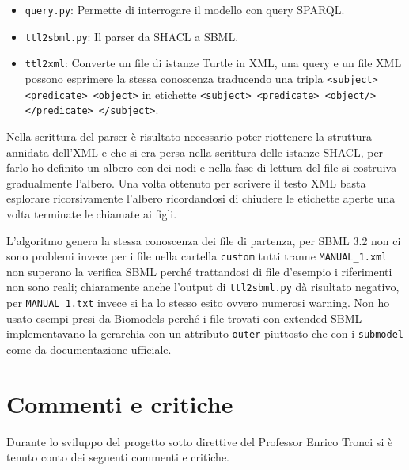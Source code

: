 \documentclass{article}
\begin{document}
\begin{itemize}
    \item \texttt{query.py}: Permette di interrogare il modello con query SPARQL.
    \item \texttt{ttl2sbml.py}: Il parser da SHACL a SBML.
    \item \texttt{ttl2xml}: Converte un file di istanze Turtle in XML, una query e un file XML possono esprimere la stessa conoscenza traducendo una tripla \texttt{<subject> <predicate> <object>} in etichette \texttt{<subject> <predicate> <object/> </predicate> </subject>}.
\end{itemize}

Nella scrittura del parser è risultato necessario poter riottenere la struttura annidata dell'XML e che si era persa nella scrittura delle istanze SHACL, per farlo ho definito un albero con dei nodi e nella fase di lettura del file si costruiva gradualmente l'albero. Una volta ottenuto per scrivere il testo XML basta esplorare ricorsivamente l'albero ricordandosi di chiudere le etichette aperte una volta terminate le chiamate ai figli. 

L'algoritmo genera la stessa conoscenza dei file di partenza, per SBML 3.2 non ci sono problemi invece per i file nella cartella \texttt{custom} tutti tranne \texttt{MANUAL\_1.xml} non superano la verifica SBML perché trattandosi di file d'esempio i riferimenti non sono reali; chiaramente anche l'output di \texttt{ttl2sbml.py} dà risultato negativo, per \texttt{MANUAL\_1.txt} invece si ha lo stesso esito ovvero numerosi warning. Non ho usato esempi presi da Biomodels perché i file trovati con extended SBML implementavano la gerarchia con un attributo \texttt{outer} piuttosto che con i \texttt{submodel} come da documentazione ufficiale.

\section{Commenti e critiche}
Durante lo sviluppo del progetto sotto direttive del Professor Enrico Tronci si è tenuto conto dei seguenti commenti e critiche. 
\end{document}
